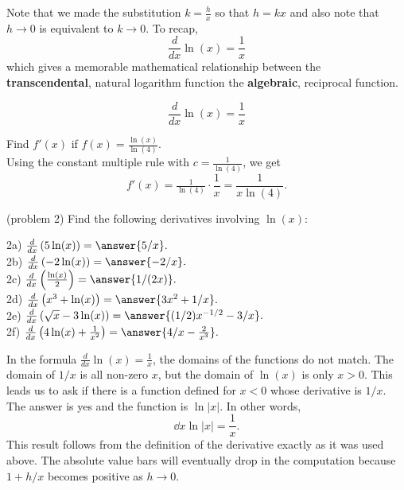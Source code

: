 \documentclass[handout]{ximera}
\begin{document}
Note that we made the substitution $k =\frac{h}{x}$ so that $h = kx$ and  also note 
that $h\to 0$ is equivalent to $k\to 0$.
To recap, 
\[
\frac{d}{dx} \ln(x) = \frac{1}{x}
\]
which gives a memorable mathematical relationship between the \textbf{transcendental}, natural logarithm function 
the \textbf{algebraic}, reciprocal function.



\begin{proposition}
\[
\frac{d}{dx} \ln(x) = \frac{1}{x}
\]
\end{proposition}



\begin{example}[example 2]
 Find $f'(x)$ if $f(x) = \frac{\ln(x)}{\ln(4)}$.\\
 Using the constant multiple rule with $c = \frac{1}{\ln(4)}$, 
 we get 
\[
f'(x) = \tfrac{1}{\ln(4)} \cdot \frac{1}{x} = \frac{1}{x\ln(4)}.
\]
\end{example}



\begin{problem}(problem 2)
Find the following derivatives involving $\ln(x)$:

2a) $\frac{d}{dx} \left(5\ln(x)\right) = \answer{5/x}.$\\
2b) $\frac{d}{dx} \left(-2\ln(x)\right) = \answer{-2/x}.$\\
2c) $\frac{d}{dx} \left(\frac{\ln(x)}{2}\right) = \answer{1/(2x)}.$\\
2d) $\frac{d}{dx} \left(x^3 + \ln(x)\right) = \answer{3x^2 + 1/x}.$\\
2e) $\frac{d}{dx} \left(\sqrt x - 3\ln(x)\right) = \answer{(1/2)x^{-1/2} - 3/x}.$\\
2f) $\frac{d}{dx} \left(4\ln(x) + \frac{1}{x^2}\right) = \answer{4/x -\frac{2}{x^3}}.$


\end{problem}





In the formula $\tfrac{d}{dx} \ln(x) = \tfrac{1}{x}$, the domains of the functions do not match.  
The domain of $1/x$ is all non-zero $x$, but the domain of 
$\ln(x)$  is only $x >0$.  This leads us to ask if there is a function defined for $x<0$ whose derivative is $1/x$. 
The answer is yes and the function is 
$\ln|x|$. In other words,
\[
\dd{x} \ln|x| = \frac{1}{x}.
\]
This result follows from the definition of the derivative exactly as it was used above.  
The absolute value bars will eventually drop in the computation because $1+h/x$ becomes positive as $h \to 0$.
 
\end{document}
